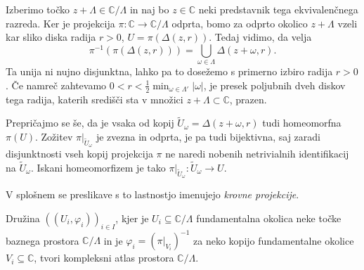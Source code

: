\documentclass[mat1]{fmfdelo}
\numberwithin{equation}{section}
\newcommand{\C}{\mathbb C}
\newcommand{\om}{\omega}
\newcommand{\inv}{^{-1}}
\newcommand{\torus}{\C/\Lambda}
\newcommand{\abs}[1]{\left\lvert #1 \right\rvert}
\newcommand{\disk}[2]{\Delta(#1, #2)}
\theoremstyle{definition}
\begin{document}
\begin{dokaz}
    Izberimo točko $z + \Lambda \in \torus$ in naj bo $z \in \C$ neki predstavnik tega ekvivalenčnega razreda. Ker je projekcija $\pi: \C \to \torus$ odprta, bomo za odprto okolico $z + \Lambda$ vzeli kar sliko diska radija $r>0$, $U = \pi(\disk{z}{r})$. Tedaj vidimo, da velja 
    \[
        \pi\inv(\pi(\disk{z}{r})) = \bigcup_{\om \in \Lambda} \disk{z + \om}{r}.
    \] 
    Ta unija ni nujno disjunktna, lahko pa to dosežemo s primerno izbiro radija $r>0$. Če namreč zahtevamo $0 < r < \frac12 \min_{\om \in \Lambda'} \abs{\om}$, je presek poljubnih dveh diskov tega radija, katerih središči sta v množici $z + \Lambda \subset \C$, prazen. 

    Prepričajmo se še, da je vsaka od kopij $\tilde{U}_\om = \disk{z + \om}{r}$ tudi homeomorfna $\pi(U)$. Zožitev $\pi|_{\tilde{U}_\om}$ je zvezna in odprta, je pa tudi bijektivna, saj zaradi disjunktnosti vseh kopij projekcija $\pi$ ne naredi nobenih netrivialnih identifikacij na $\tilde{U}_\om$. Iskani homeomorfizem je tako $\pi|_{\tilde{U}_\om} : \tilde{U}_\om \to U$.
\end{dokaz}

\begin{opomba}
    V splošnem se preslikave s to lastnostjo imenujejo \emph{krovne projekcije}.
\end{opomba}

\begin{trditev}
    Družina $((U_i, \varphi_i))_{i \in I}$, kjer je $U_i \subseteq \torus$ fundamentalna okolica neke točke baznega prostora $\torus$ in je $\varphi_i = (\pi|_{V_i})\inv$ za neko kopijo fundamentalne okolice $V_i \subseteq \C$, tvori kompleksni atlas prostora $\torus$.  
\end{trditev}
\end{document}
